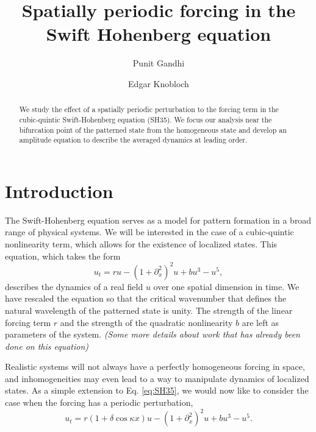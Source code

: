 \documentclass[api,pof,pre,12pt,a4paper]{revtex4-1}
\begin{document}

\title{Spatially periodic forcing in the Swift Hohenberg equation}

\author{Punit Gandhi}
\author{Edgar Knobloch}

\begin{abstract}
We study the effect of a spatially periodic perturbation to the forcing term in the cubic-quintic Swift-Hohenberg equation (SH35).  We focus our analysis near the bifurcation point of the patterned state from the homogeneous state and develop an amplitude equation to describe the averaged dynamics at leading order.  
\end{abstract}

\maketitle

\section{Introduction}
The Swift-Hohenberg equation serves as a model for pattern formation in a broad range of physical systems.  We will be interested in the case of a cubic-quintic nonlinearity term, which allows for the existence of localized states.  This equation, which takes the form  
\begin{equation}
u_t= r u-\left(1+\partial_{x}^2\right)^2u+bu^3-u^5\label{eq:SH35},
\end{equation}
describes the dynamics of a real field $u$ over one spatial dimension in time.  We have rescaled the equation so that the critical wavenumber that defines the natural wavelength of the patterned state is unity. The strength of the linear forcing term $r$ and the strength of the quadratic nonlinearity $b$ are left as parameters of the system.  {\it (Some more details about work that has already been done on this equation)} 


Realistic systems will not always have a perfectly homogeneous forcing in space, and inhomogeneities may even lead to a way to manipulate dynamics of localized states. As a simple extension to Eq. \ref{eq:SH35}, we would now like to consider the case when the forcing has a periodic perturbation,
\begin{equation}
u_t= r(1+\delta \cos{\kappa x}) u -\left(1+\partial_{x}^2\right)^2u+bu^3-u^5\label{eq:SH35spf}.
\end{equation}
\end{document}
